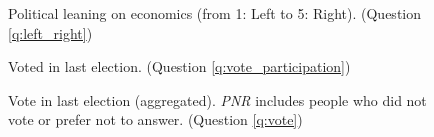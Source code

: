 \begin{figure}[h!] 
    \caption[Political leaning]{Political leaning on economics (from 1: Left to 5: Right). (Question \ref{q:left_right})}\label{fig:left_right}
\end{figure}

\begin{figure}[h!] 
    \caption[Voted in last election]{Voted in last election. (Question \ref{q:vote_participation})}\label{fig:vote_participation}
\end{figure}

\begin{figure}[h!] 
    \caption[Vote in last election]{Vote in last election (aggregated). \textit{PNR} includes people who did not vote or prefer not to answer. (Question \ref{q:vote})}\label{fig:vote}
\end{figure}

